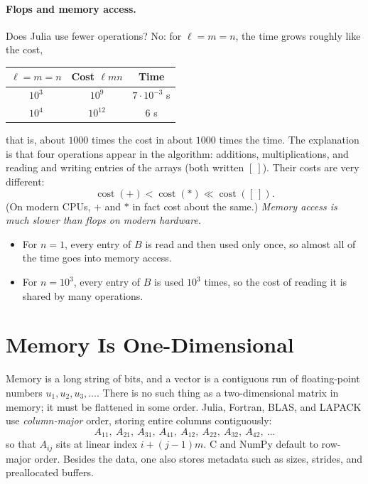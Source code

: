 \paragraph{Flops and memory access.} Does Julia use fewer operations? No: for $\ell = m = n$, the time grows roughly like the cost,
\begin{center}
\begin{tabular}{ccc}
  \toprule
  $\ell = m = n$ & Cost $\ell mn$ & Time \\
  \midrule
  $10^3$ & $10^9$ & $7 \cdot 10^{-3}$ s \\
  $10^4$ & $10^{12}$ & $6$ s \\
  \bottomrule
\end{tabular}
\end{center}
that is, about $1000$ times the cost in about $1000$ times the time. The explanation is that four operations appear in the algorithm: additions, multiplications, and reading and writing entries of the arrays (both written $[\ ]$). Their costs are very different:
\begin{equation}
  \operatorname{cost}(+) < \operatorname{cost}(\ast) \ll \operatorname{cost}([\ ]).
\end{equation}
(On modern CPUs, $+$ and $\ast$ in fact cost about the same.)
\emph{Memory access is much slower than flops on modern hardware.}
\begin{itemize}
  \item For $n = 1$, every entry of $B$ is read and then used only once, so almost all of the time goes into memory access.
  \item For $n = 10^3$, every entry of $B$ is used $10^3$ times, so the cost of reading it is shared by many operations.
\end{itemize}

\section{Memory Is One-Dimensional}

Memory is a long string of bits, and a vector is a contiguous run of floating-point numbers $u_1, u_2, u_3, \dots$. There is no such thing as a two-dimensional matrix in memory; it must be flattened in some order. Julia, Fortran, BLAS, and LAPACK use \emph{column-major} order, storing entire columns contiguously:
\begin{equation}
  A_{11},\ A_{21},\ A_{31},\ A_{41},\ A_{12},\ A_{22},\ A_{32},\ A_{42},\ \dots
\end{equation}
so that $A_{ij}$ sits at linear index $i + (j - 1)m$. C and NumPy default to row-major order. Besides the data, one also stores metadata such as sizes, strides, and preallocated buffers.

